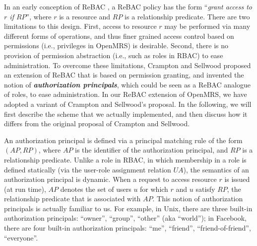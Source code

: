 \documentclass{acm_proc_article-sp}
\newcommand{\Dfn}[1]{\textbf{\emph{#1}}}
\begin{document}
In an early conception of ReBAC \cite{Bruns-etal:2012}, a ReBAC policy
has the form ``\emph{grant access to $r$ if $\mathit{RP}$}'', where
$r$ is a resource and $\mathit{RP}$ is a relationship predicate.
There are two limitations to this design. First, access to resource
$r$ may be performed via many different forms of operations, and thus
finer grained access control based on permissions (i.e., privileges in
OpenMRS) is desirable. Second, there is no provision of permission
abstraction (i.e., such as roles in RBAC) to ease administration.  To
overcome these limitations, Crampton and Sellwood
\cite{Crampton-Sellwood:2014} proposed an extension of ReBAC that is
based on permission granting, and invented the notion of
\Dfn{authorization principals}, which could be seen as a ReBAC
analogue of roles, to ease administration.  In our ReBAC extension of
OpenMRS, we have adopted a variant of Crampton and Sellwood's
proposal.  In the following, we will first describe the scheme that we
actually implemented, and then discuss how it differs from the
original proposal of Crampton and Sellwood.

An authorization principal is defined via a principal matching rule of
the form $(\mathit{AP}, \mathit{RP})$, where $\mathit{AP}$ is the
identifier of the authorization principal, and $\mathit{RP}$ is a
relationship predicate.  Unlike a role in RBAC, in which membership in
a role is defined statically (via the user-role assignment relation
$\mathit{UA}$), the semantics of an authorization principal is
dynamic.  When a request to access resource $r$ is issued (at run
time), $\mathit{AP}$ denotes the set of users $u$ for which $r$ and
$u$ satisfy $\mathit{RP}$, the relationship predicate that is
associated with $\mathit{AP}$.  This notion of authorization
principals is actually familiar to us.  For example, in Unix, there
are three built-in authorization principals: ``owner'', ``group'',
``other'' (aka ``world''); in Facebook, there are four built-in
authorization principals: ``me'', ``friend'', ``friend-of-friend'',
``everyone''.
\end{document}
